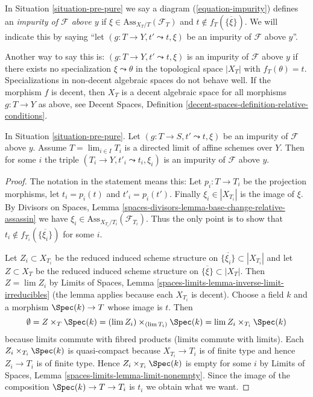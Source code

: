 \begin{definition}
\label{definition-impurity}
In
Situation \ref{situation-pre-pure}
we say a diagram (\ref{equation-impurity}) defines an
{\it impurity of $\mathcal{F}$ above $y$}
if $\xi \in \text{Ass}_{X_T/T}(\mathcal{F}_T)$ and
$t \not \in f_T(\overline{\{\xi\}})$. We will indicate
this by saying ``let $(g : T \to Y, t' \leadsto t, \xi)$ be
an impurity of $\mathcal{F}$ above $y$''.
\end{definition}

\noindent
Another way to say this is: $(g : T \to Y, t' \leadsto t, \xi)$ is
an impurity of $\mathcal{F}$ above $y$ if there exists no specialization
$\xi \leadsto \theta$ in the topological space $|X_T|$ with
$f_T(\theta) = t$. Specializations in non-decent algebraic spaces
do not behave well. If the morphism $f$ is decent, then $X_T$
is a decent algebraic space for all morphisms $g : T \to Y$ as above, see
Decent Spaces, Definition \ref{decent-spaces-definition-relative-conditions}.

\begin{lemma}
\label{lemma-impure-limit}
In Situation \ref{situation-pre-pure}.
Let $(g : T \to S, t' \leadsto t, \xi)$ be an impurity of
$\mathcal{F}$ above $y$. Assume $T = \lim_{i \in I} T_i$ is a directed limit
of affine schemes over $Y$. Then for some $i$ the triple
$(T_i \to Y, t'_i \leadsto t_i, \xi_i)$ is an impurity of
$\mathcal{F}$ above $y$.
\end{lemma}

\begin{proof}
The notation in the statement means this: Let $p_i : T \to T_i$
be the projection morphisms, let $t_i = p_i(t)$ and $t'_i = p_i(t')$.
Finally $\xi_i \in |X_{T_i}|$ is the image of $\xi$. By
Divisors on Spaces, Lemma
\ref{spaces-divisors-lemma-base-change-relative-assassin}
we have $\xi_i \in \text{Ass}_{X_{T_i}/T_i}(\mathcal{F}_{T_i})$.
Thus the only point is to show that
$t_i \not \in f_{T_i}(\overline{\{\xi_i\}})$ for some $i$.

\medskip\noindent
Let $Z_i \subset X_{T_i}$ be the reduced induced scheme structure
on $\overline{\{\xi_i\}} \subset |X_{T_i}|$
and let $Z \subset X_T$ be the reduced induced scheme structure on
$\overline{\{\xi\}} \subset |X_T|$.
Then $Z = \lim Z_i$ by
Limits of Spaces, Lemma \ref{spaces-limits-lemma-inverse-limit-irreducibles}
(the lemma applies because each $X_{T_i}$ is decent).
Choose a field $k$ and a morphism $\Spec(k) \to T$ whose image is $t$.
Then
$$
\emptyset =
Z \times_T \Spec(k) = (\lim Z_i) \times_{(\lim T_i)} \Spec(k)
= \lim Z_i \times_{T_i} \Spec(k)
$$
because limits commute with fibred products (limits commute with limits).
Each $Z_i \times_{T_i} \Spec(k)$ is quasi-compact because $X_{T_i} \to T_i$
is of finite type and hence $Z_i \to T_i$ is of finite type.
Hence $Z_i \times_{T_i} \Spec(k)$ is empty for some $i$ by
Limits of Spaces, Lemma \ref{spaces-limits-lemma-limit-nonempty}.
Since the image of the composition $\Spec(k) \to T \to T_i$ is $t_i$
we obtain what we want.
\end{proof}

